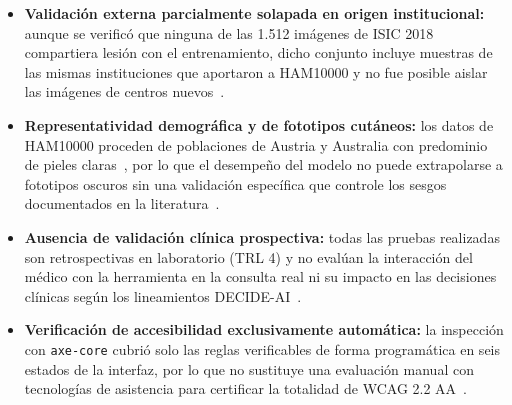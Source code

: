 \begin{itemize}
  \item \textbf{Validación externa parcialmente solapada en origen institucional:} aunque se verificó que ninguna de las 1.512 imágenes de ISIC 2018 compartiera lesión con el entrenamiento, dicho conjunto incluye muestras de las mismas instituciones que aportaron a HAM10000 y no fue posible aislar las imágenes de centros nuevos~\cite{codella2019isic2018,tschandl2018ham10000}.
  \item \textbf{Representatividad demográfica y de fototipos cutáneos:} los datos de HAM10000 proceden de poblaciones de Austria y Australia con predominio de pieles claras~\cite{tschandl2018ham10000}, por lo que el desempeño del modelo no puede extrapolarse a fototipos oscuros sin una validación específica que controle los sesgos documentados en la literatura~\cite{daneshjou2022disparities}.
  \item \textbf{Ausencia de validación clínica prospectiva:} todas las pruebas realizadas son retrospectivas en laboratorio (TRL 4) y no evalúan la interacción del médico con la herramienta en la consulta real ni su impacto en las decisiones clínicas según los lineamientos DECIDE-AI~\cite{vasey2022decideai,marchetti2023proveai,heinlein2024multicenter}.
  \item \textbf{Verificación de accesibilidad exclusivamente automática:} la inspección con \texttt{axe-core} cubrió solo las reglas verificables de forma programática en seis estados de la interfaz, por lo que no sustituye una evaluación manual con tecnologías de asistencia para certificar la totalidad de WCAG 2.2 AA~\cite{w3c2023wcag22}.
\end{itemize}
